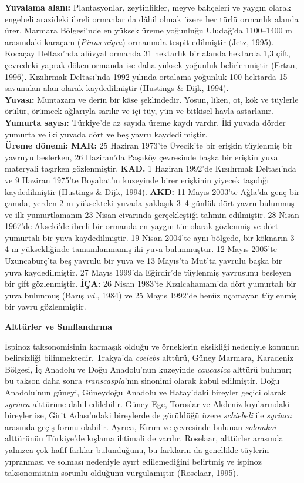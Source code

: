 \documentclass[
  10.5pt,
  a4paper,
  DIV=11,
  numbers=noendperiod,
  twocolumn]{scrreprt}
\begin{document}
\textbf{Yuvalama alanı:} Plantasyonlar, zeytinlikler, meyve bahçeleri ve
yaygın olarak engebeli arazideki ibreli ormanlar da dâhil olmak üzere
her türlü ormanlık alanda ürer. Marmara Bölgesi'nde en yüksek üreme
yoğunluğu Uludağ'da 1100--1400 m arasındaki karaçam (\emph{Pinus nigra})
ormanında tespit edilmiştir (Jetz, 1995). Kocaçay Deltası'nda alüvyal
ormanda 31 hektarlık bir alanda hektarda 1,3 çift, çevredeki yaprak
döken ormanda ise daha yüksek yoğunluk belirlenmiştir (Ertan, 1996).
Kızılırmak Deltası'nda 1992 yılında ortalama yoğunluk 100 hektarda 15
savunulan alan olarak kaydedilmiştir (Hustings \& Dijk, 1994).\\
\textbf{Yuvası:} Muntazam ve derin bir kâse şeklindedir. Yosun, liken,
ot, kök ve tüylerle örülür, örümcek ağlarıyla sarılır ve içi tüy, yün ve
bitkisel havla astarlanır.\\
\textbf{Yumurta sayısı:} Türkiye'de az sayıda üreme kaydı vardır. İki
yuvada dörder yumurta ve iki yuvada dört ve beş yavru kaydedilmiştir.\\
\textbf{Üreme dönemi:} \textbf{MAR:} 25 Haziran 1973'te Üvecik'te bir
erişkin tüylenmiş bir yavruyu beslerken, 26 Haziran'da Paşaköy
çevresinde başka bir erişkin yuva materyali taşırken gözlenmiştir.
\textbf{KAD.} 1 Haziran 1992'de Kızılırmak Deltası'nda ve 9 Haziran
1975'te Boyabat'ın kuzeyinde birer erişkinin yiyecek taşıdığı
kaydedilmiştir (Hustings \& Dijk, 1994). \textbf{AKD:} 11 Mayıs 2003'te
Ağla'da genç bir çamda, yerden 2 m yüksekteki yuvada yaklaşık 3--4
günlük dört yavru bulunmuş ve ilk yumurtlamanın 23 Nisan civarında
gerçekleştiği tahmin edilmiştir. 28 Nisan 1967'de Akseki'de ibreli bir
ormanda en yaygın tür olarak gözlenmiş ve dört yumurtalı bir yuva
kaydedilmiştir. 19 Nisan 2004'te aynı bölgede, bir köknarın 3--4 m
yüksekliğinde tamamlanmamış iki yuva bulunmuştur. 12 Mayıs 2005'te
Uzuncaburç'ta beş yavrulu bir yuva ve 13 Mayıs'ta Mut'ta yavrulu başka
bir yuva kaydedilmiştir. 27 Mayıs 1999'da Eğirdir'de tüylenmiş yavrusunu
besleyen bir çift gözlenmiştir. \textbf{İÇA:} 26 Nisan 1983'te
Kızılcahamam'da dört yumurtalı bir yuva bulunmuş (Barış \emph{vd.},
1984) ve 25 Mayıs 1992'de henüz uçamayan tüylenmiş bir yavru
gözlenmiştir.

\textbf{Alttürler ve Sınıflandırma}

İspinoz taksonomisinin karmaşık olduğu ve örneklerin eksikliği nedeniyle
konunun belirsizliği bilinmektedir. Trakya'da \emph{coelebs} alttürü,
Güney Marmara, Karadeniz Bölgesi, İç Anadolu ve Doğu Anadolu'nun
kuzeyinde \emph{caucasica} alttürü bulunur; bu takson daha sonra
\emph{transcaspia}'nın sinonimi olarak kabul edilmiştir. Doğu
Anadolu'nun güneyi, Güneydoğu Anadolu ve Hatay'daki bireyler geçici
olarak \emph{syriaca} alttürüne dahil edilebilir. Güney Ege, Toroslar ve
Akdeniz kıyılarındaki bireyler ise, Girit Adası'ndaki bireylerde de
görüldüğü üzere \emph{schiebeli} ile \emph{syriaca} arasında geçiş formu
olabilir. Ayrıca, Kırım ve çevresinde bulunan \emph{solomkoi} alttürünün
Türkiye'de kışlama ihtimali de vardır. Roselaar, alttürler arasında
yalnızca çok hafif farklar bulunduğunu, bu farkların da genellikle
tüylerin yıpranması ve solması nedeniyle ayırt edilemediğini belirtmiş
ve ispinoz taksonomisinin sorunlu olduğunu vurgulamıştır (Roselaar,
1995).
\end{document}
